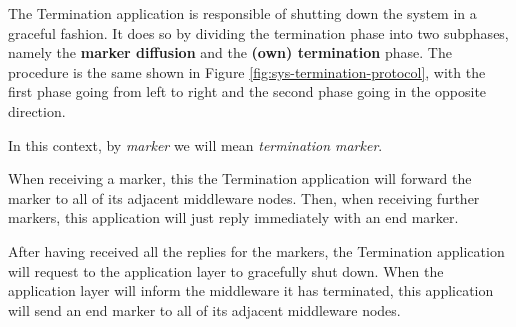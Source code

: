 \label{sec:mw-termination-descr}

The Termination application is responsible of shutting down the system in a
graceful fashion.
It does so by dividing the termination phase into two subphases, namely the
\textbf{marker diffusion} and the \textbf{(own) termination} phase. The
procedure is the same shown in Figure \ref{fig:sys-termination-protocol}, with
the first phase going from left to right and the second phase going in the
opposite direction.

In this context, by \textit{marker} we will mean \textit{termination marker}.

When receiving a marker, this the Termination application will forward the marker
to all of its adjacent middleware nodes.
Then, when receiving further markers, this application will just reply immediately
with an end marker.

After having received all the replies for the markers, the Termination application
will request to the application layer to gracefully shut down.
When the application layer will inform the middleware it has terminated, this
application will send an end marker to all of its adjacent middleware nodes.
